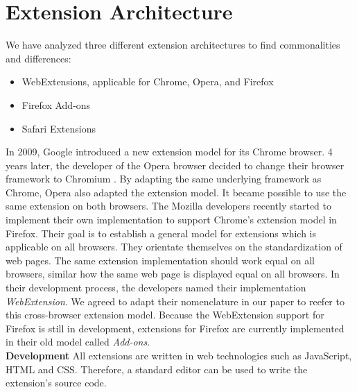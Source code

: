 
\section{Extension Architecture}

	We have analyzed three different extension architectures to find commonalities and differences: 
	\begin{itemize}
		\itemsep-0.5em
		\item WebExtensions, applicable for Chrome, Opera, and Firefox
		\item Firefox Add-ons
		\item Safari Extensions
	\end{itemize}
	
	In 2009, Google introduced a new extension model for its Chrome browser. 4 years later, the developer of the Opera browser decided to change their browser framework to Chromium \cite{operaBlogSwitchToChromium}. By adapting the same underlying framework as Chrome, Opera also adapted the extension model. It became possible to use the same extension on both browsers. The Mozilla developers recently started to implement their own implementation to support Chrome's extension model in Firefox. Their goal is to establish a general model for extensions which is applicable on all browsers. They orientate themselves on the standardization of web pages. The same extension implementation should work equal on all browsers, similar how the same web page is displayed equal on all browsers. %
	In their development process, the developers named their implementation \textit{WebExtension}. We agreed to adapt their nomenclature in our paper to reefer to this cross-browser extension model. Because the WebExtension support for Firefox is still in development, extensions for Firefox are currently implemented in their old model called \textit{Add-ons}. \\
	
	\textbf{Development} All extensions are written in web technologies such as JavaScript, HTML and CSS. Therefore, a standard editor can be used to write the extension's source code. 
	
